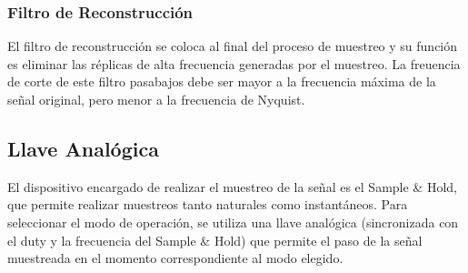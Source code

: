\subsubsection{Filtro de Reconstrucción}
El filtro de reconstrucción se coloca al final del proceso de muestreo y su función es eliminar las réplicas de alta frecuencia generadas por el muestreo.
La freuencia de corte de este filtro pasabajos debe ser mayor a la frecuencia máxima de la señal original, pero menor a la frecuencia de Nyquist.
\subsection{Llave Analógica}
El dispositivo encargado de realizar el muestreo de la señal es el Sample \& Hold, que permite realizar muestreos 
tanto naturales como instantáneos. Para seleccionar el modo de operación, se utiliza una llave analógica (sincronizada
con el duty y la frecuencia del Sample \& Hold) que permite el paso de la señal muestreada en el momento correspondiente al modo elegido.
